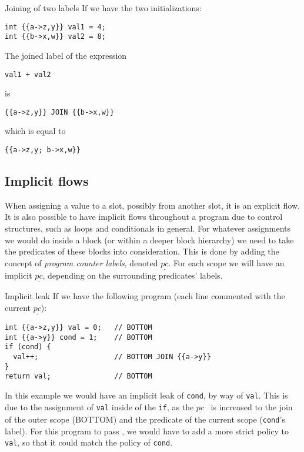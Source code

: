 \begin{example}{Joining of two labels}
  If we have the two initializations:
  \begin{lstlisting}[style=dlmc]
int {{a->z,y}} val1 = 4;
int {{b->x,w}} val2 = 8;
  \end{lstlisting}
  The joined label of the expression\\
  \begin{lstlisting}[style=dlmc]
val1 + val2
  \end{lstlisting}
  is
  \begin{lstlisting}[style=dlmc]
{{a->z,y}} JOIN {{b->x,w}}
  \end{lstlisting}
  which is equal to
  \begin{lstlisting}[style=dlmc]
{{a->z,y; b->x,w}}
  \end{lstlisting}
\end{example}

\newcommand{\dlmpc}{$\underline{pc}$}

\subsection{Implicit flows}
When assigning a value to a slot, possibly from another slot, it is an explicit flow.
It is also possible to have implicit flows throughout a program due to control structures, such as loops and conditionals in general.
For whatever assignments we would do inside a block (or within a deeper block hierarchy) we need to take the predicates of these blocks into consideration.
This is done by adding the concept of \emph{program counter labels}, denoted \dlmpc.
For each scope we will have an implicit \dlmpc, depending on the surrounding predicates' labels.

\begin{example}{Implicit leak}\label{dlm:ex:implicit_leak}
  If we have the following program (each line commented with the current \dlmpc):
  \begin{lstlisting}[style=dlmc]
int {{a->z,y}} val = 0;   // BOTTOM
int {{a->y}} cond = 1;    // BOTTOM
if (cond) {
  val++;                  // BOTTOM JOIN {{a->y}}
}
return val;               // BOTTOM
  \end{lstlisting}
  In this example we would have an implicit leak of \texttt{cond}, by way of \texttt{val}.
  This is due to the assignment of \texttt{val} inside of the \texttt{if}, as the \dlmpc~ is increased to the join of the outer scope (BOTTOM) and the predicate of the current scope (\texttt{cond}'s label).
  For this program to pass \thetool, we would have to add a more strict policy to \texttt{val}, so that it could match the policy of \texttt{cond}.
\end{example}

